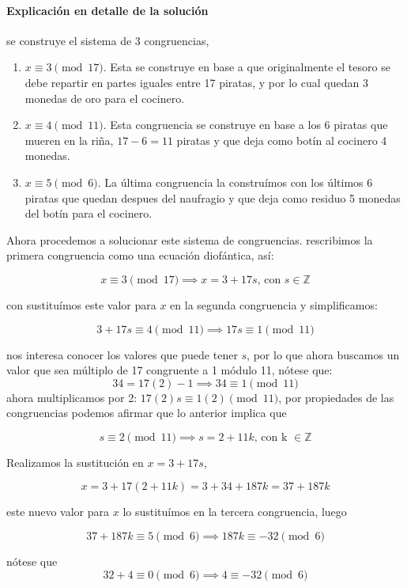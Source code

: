\documentclass{article}
\begin{document}
	\paragraph{Explicación en detalle de la solución} se construye el sistema de 3 congruencias,
	
	\begin{enumerate}
		\item $x \equiv 3 \pmod{17}$. Esta se construye en base a que originalmente el tesoro se debe repartir en partes iguales entre 17 piratas, y por lo cual quedan 3 monedas de oro para el cocinero.
		\item $x \equiv 4 \pmod{11}$. Esta congruencia se construye en base a los 6 piratas que mueren en la riña, $17-6 = 11$ piratas y que deja como botín al cocinero 4 monedas.
		\item $x \equiv 5 \pmod{6}$. La última congruencia la construímos con los últimos 6 piratas que quedan despues del naufragio y que deja como residuo 5 monedas del botín para el cocinero.
	\end{enumerate}
	
	Ahora procedemos a solucionar este sistema de congruencias. rescribimos la primera congruencia como una ecuación diofántica, así:
	
	$$x \equiv 3 \pmod{17} \implies x = 3 + 17s \text{, con } s \in \mathbb{Z}$$
	
	con sustituímos este valor para $x$ en la segunda congruencia y simplificamos:
	
	$$3 + 17s \equiv 4 \pmod{11} \implies 17s \equiv 1 \pmod{11}$$
	
	nos interesa conocer los valores que puede tener $s$, por lo que ahora buscamos un valor que sea múltiplo de 17 congruente a 1 módulo 11, nótese que:
	$$34 = 17(2) - 1 \implies 34 \equiv 1 \pmod{11}$$
	ahora multiplicamos por 2: $17(2)s \equiv 1(2) \pmod{11}$, por propiedades de las congruencias podemos afirmar que lo anterior implica que 
	
	$$s \equiv 2 \pmod{11} \implies s = 2 + 11k \text{, con k } \in \mathbb{Z}$$
	
	Realizamos la sustitución en $x = 3 + 17s$,
	
	$$x = 3 + 17(2 + 11k) = 3 + 34 + 187k = 37 + 187k$$
	
	este nuevo valor para $x$ lo sustituímos en la tercera congruencia, luego
	
	$$37 + 187k \equiv 5 \pmod{6} \implies 187k \equiv -32 \pmod{6}$$
	
	nótese que 
	$$32 + 4 \equiv 0 \pmod{6} \implies 4 \equiv -32 \pmod{6}$$
	
\end{document}
